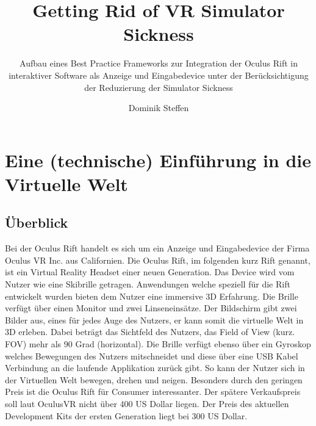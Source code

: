 \documentclass[pagesize, paper=a4, fontsize=12pt,titlepage=true, headings=small, headnosepline, abstractoff, liststotoc, nochapterprefix, plainheadsepline]{scrreprt}
\author{
Dominik Steffen
}
\title{Getting Rid of VR Simulator Sickness}
\subtitle{Aufbau eines Best Practice Frameworks zur Integration der Oculus Rift in interaktiver Software als Anzeige und Eingabedevice unter der Berücksichtigung der Reduzierung der Simulator Sickness}
\begin{document}
\maketitle
%

\mbox{}

\begingroup
	\clearpage
	\pagestyle{empty}
	\tableofcontents
	\clearpage
\endgroup
\thispagestyle{empty}
\mbox{}


\renewcommand*{\chapterpagestyle}{plain}
\pagestyle{plain}
\setcounter{page}{0}

\chapter{Eine (technische) Einführung in die Virtuelle Welt}

\section{Überblick}
Bei der Oculus Rift handelt es sich um ein Anzeige und Eingabedevice der Firma Oculus VR Inc. aus Californien. Die Oculus Rift, im folgenden kurz Rift genannt, ist ein Virtual Reality Headset einer neuen Generation. Das Device wird vom Nutzer wie eine Skibrille getragen. Anwendungen welche speziell für die Rift entwickelt wurden bieten dem Nutzer eine immersive 3D Erfahrung. Die Brille verfügt über einen Monitor und zwei Linseneinsätze. Der Bildschirm gibt zwei Bilder aus, eines für jedes Auge des Nutzers, er kann somit die virtuelle Welt in 3D erleben. Dabei beträgt das Sichtfeld des Nutzers, das Field of View (kurz. FOV) mehr als 90 Grad (horizontal). Die Brille verfügt ebenso über ein Gyroskop welches Bewegungen des Nutzers mitschneidet und diese über eine USB Kabel Verbindung an die laufende Applikation zurück gibt. So kann der Nutzer sich in der Virtuellen Welt bewegen, drehen und neigen. Besonders durch den geringen Preis ist die Oculus Rift für Consumer interessanter. Der spätere Verkaufspreis soll laut OculusVR nicht über 400 US Dollar liegen. Der Preis des aktuellen Development Kits der ersten Generation liegt bei 300 US Dollar.
\end{document}
